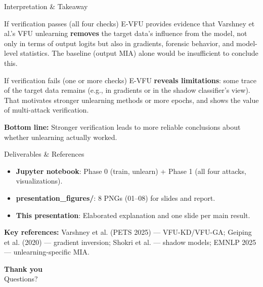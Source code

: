 \documentclass[11pt,aspectratio=169]{beamer}
\begin{document}
\begin{frame}{Interpretation \& Takeaway}
  \begin{block}{If verification passes (all four checks)}
    E-VFU provides evidence that Varshney et al.'s VFU unlearning \textbf{removes} the target data's influence from the model, not only in terms of output logits but also in gradients, forensic behavior, and model-level statistics. The baseline (output MIA) alone would be insufficient to conclude this.
  \end{block}
  \vspace{0.5em}
  \begin{block}{If verification fails (one or more checks)}
    E-VFU \textbf{reveals limitations}: some trace of the target data remains (e.g., in gradients or in the shadow classifier's view). That motivates stronger unlearning methods or more epochs, and shows the value of multi-attack verification.
  \end{block}
  \vspace{0.5em}
  \textbf{Bottom line:} Stronger verification leads to more reliable conclusions about whether unlearning actually worked.
\end{frame}

\begin{frame}{Deliverables \& References}
  \begin{itemize}
    \item \textbf{Jupyter notebook}: Phase 0 (train, unlearn) + Phase 1 (all four attacks, visualizations).
    \item \textbf{presentation\_figures/}: 8 PNGs (01--08) for slides and report.
    \item \textbf{This presentation}: Elaborated explanation and one slide per main result.
  \end{itemize}
  \vspace{0.5em}
  \textbf{Key references:} Varshney et al. (PETS 2025) — VFU-KD/VFU-GA; Geiping et al. (2020) — gradient inversion; Shokri et al. — shadow models; EMNLP 2025 — unlearning-specific MIA.
\end{frame}

\begin{frame}{}
  \begin{center}
    \Large \textbf{Thank you}\\[1em]
    \normalsize Questions?
  \end{center}
\end{frame}
\end{document}
